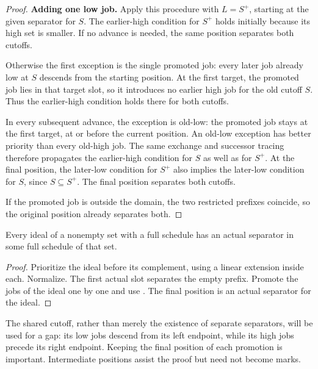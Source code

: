 \begin{proof}
\smallskip\noindent\textbf{Adding one low job.}
Apply this procedure with \(L=S^+\), starting at the given
separator for \(S\). The earlier-high condition for \(S^+\)
holds initially because its high set is smaller. If no advance is
needed, the same position separates both cutoffs.

Otherwise the first exception is the single promoted job: every
later job already low at \(S\) descends from the starting position.
At the first target, the promoted job lies in that target slot,
so it introduces no earlier high job for the old cutoff \(S\).
Thus the earlier-high condition holds there for both cutoffs.

In every subsequent advance, the exception is old-low: the promoted
job stays at the first target, at or before the current position.
An old-low exception has better priority than every old-high job.
The same exchange and successor tracing therefore propagates the
earlier-high condition for \(S\) as well as for \(S^+\).
At the final position, the later-low condition for \(S^+\) also
implies the later-low condition for \(S\), since \(S\subseteq S^+\).
The final position separates both cutoffs.

If the promoted job is outside the domain, the two restricted
prefixes coincide, so the original position already separates both.
\end{proof}

\begin{corollary}\label{cor:any-ideal}
Every ideal of a nonempty set with a full schedule has an actual
separator in some full schedule of that set.
\end{corollary}
\begin{proof}
Prioritize the ideal before its complement, using a linear extension
inside each. Normalize. The first actual slot separates the empty
prefix. Promote the jobs of the ideal one by one and use
. The final position is an actual separator for
the ideal.
\end{proof}

The shared cutoff, rather than merely the existence of separate
separators, will be used for a gap: its low jobs descend from its
left endpoint, while its high jobs precede its right endpoint.
Keeping the final position of each promotion is important. Intermediate
positions assist the proof but need not become marks.
